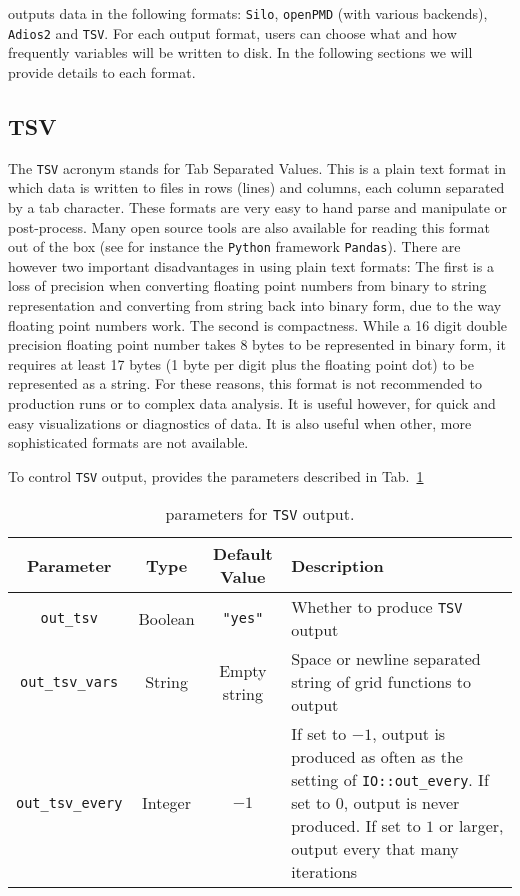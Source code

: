 \CarpetX\space outputs data in the following formats: \texttt{Silo}, \texttt{openPMD} (with various backends), \texttt{Adios2} and \texttt{TSV}. For each output format, users can choose what and how frequently variables will be written to disk. In the following sections we will provide details to each format.

\subsection{TSV}
\label{sec:tsv}

The \texttt{TSV} acronym stands for Tab Separated Values. This is a plain text format in which data is written to files in rows (lines) and columns, each column separated by a tab character. These formats are very easy to hand parse and manipulate or post-process. Many open source tools are also available for reading this format out of the box (see for instance the \texttt{Python} framework \texttt{Pandas}). There are however two important disadvantages in using plain text formats: The first is a loss of precision when converting floating point numbers from binary to string representation and converting from string back into binary form, due to the way floating point numbers work. The second is compactness. While a 16 digit double precision floating point number takes 8 bytes to be represented in binary form, it requires at least 17 bytes (1 byte per digit plus the floating point dot) to be represented as a string. For these reasons, this format is not recommended to production runs or to complex data analysis. It is useful however, for quick and easy visualizations or diagnostics of data. It is also useful when other, more sophisticated formats are not available.

To control \texttt{TSV} output, \CarpetX\space provides the parameters described in Tab.~\ref{tab:tsv_params}

\begin{table}[ht]
  \centering
  \begin{tabularx}{\textwidth}{cccX}
    Parameter                & Type    & Default Value  & Description \\\hline\hline
    \texttt{out\_tsv}        & Boolean & \texttt{"yes"} & Whether to produce \texttt{TSV} output \\
    \texttt{out\_tsv\_vars}  & String  & Empty string   & Space or newline separated string of grid functions to output \\
    \texttt{out\_tsv\_every} & Integer & $-1$           & If set to $-1$, output is produced as often as the setting of \texttt{IO::out\_every}. If set to $0$, output is never produced. If set to $1$ or larger, output every that many iterations \\\hline\hline
  \end{tabularx}
  \label{tab:tsv_params}
  \caption{\CarpetX\space parameters for \texttt{TSV} output.}
\end{table}

